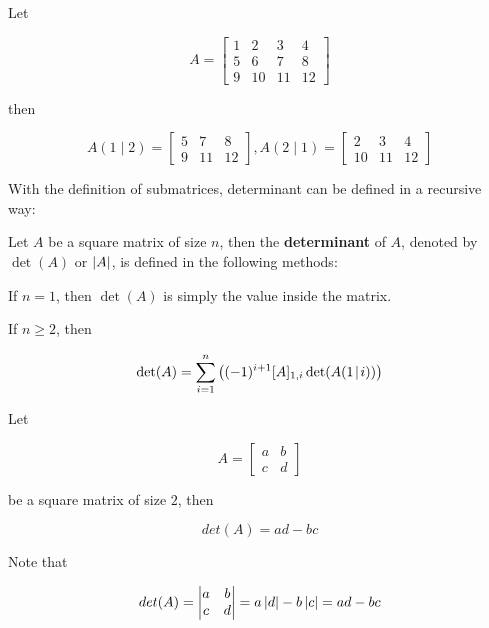 \documentclass[a4paper,12pt]{article}
\begin{document}
\begin{exm}
  Let

  $$A=\begin{bmatrix}
    1 & 2 & 3 & 4\\
    5 & 6 & 7 & 8\\
    9 & 10 & 11 & 12
  \end{bmatrix}$$\s

  then

  $$A(1\!\mid\!2)=\begin{bmatrix}
    5 & 7 & 8\\
    9 & 11 & 12
  \end{bmatrix},A(2\!\mid\!1)=\begin{bmatrix}
    2 & 3 & 4\\
    10 & 11 & 12
  \end{bmatrix}$$
\end{exm}\n

With the definition of submatrices, determinant can be defined in a recursive way:\n

\begin{dft}
  Let $A$ be a square matrix of size $n$, then the \textbf{determinant} of $A$, denoted by $\det(A)$ or $\left| A\right|$, is defined in the following methods:

  \begin{alist}
    \item If $n=1$, then $\det(A)$ is simply the value inside the matrix.
    \item If $n\geq 2$, then
    
    $$\det(A)=\sum_{i=1}^{n}\left( (-1)^{i+1}[A]_{1,i}\det(A(1\!\mid\!i))\right)$$
  \end{alist}
\end{dft}\n

\begin{thm}
  Let

  $$A=\begin{bmatrix}
    a & b\\
    c & d
  \end{bmatrix}$$\s

  be a square matrix of size $2$, then
  
  $$det(A)=ad-bc$$\s

  \prf Note that

  $$det(A)=\left| \begin{matrix}
    a & b\\
    c & d
  \end{matrix}\right|=a\left| d\right|-b\left| c\right|=ad-bc$$
\end{thm}\n
\end{document}

